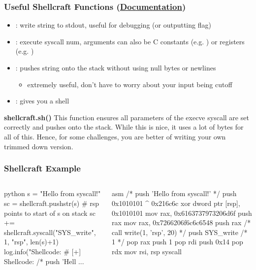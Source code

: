 \documentclass[aspectratio=169]{beamer}
\newcommand{\docl}[1]{(\textbf{\href{#1}{Documentation}})}
\begin{document}
{\begin{frame}[fragile]
    \frametitle{Useful Shellcraft Functions \docl{http://docs.pwntools.com/en/stable/shellcraft/amd64.html}}
    \begin{itemize}
        \item {}: write string to stdout, useful for debugging (or outputting flag)
        \item {}: execute syscall num, arguments can also be C constants (e.g. ) or registers (e.g. )
        \item {}: pushes string onto the stack without using null bytes or newlines
        \begin{itemize}
            \item extremely useful, don't have to worry about your input being cutoff
        \end{itemize}
        \item {}: gives you a shell
    \end{itemize}
    \begin{alertblock}{\textbf{shellcraft.sh()}}
        This function ensures all parameters of the execve syscall are set correctly and pushes  onto the stack.
        While this is nice, it uses a lot of bytes for all of this.
        Hence, for some challenges, you are better of writing your own trimmed down version.
    \end{alertblock}

\end{frame}

\begin{frame}[fragile]
    \frametitle{Shellcraft Example}
    \begin{columns}
        \begin{column}{0.5\textwidth}
            \begin{codebox}{python}
s = "Hello from syscall!"
sc = shellcraft.pushstr(s)
# rsp points to start of s on stack
sc += shellcraft.syscall("SYS_write",
    1, "rsp", len(s)+1)
log.info("Shellcode: %
# [+] Shellcode: /* push 'Hell ... \end{codebox}
        \end{column}
        \begin{column}{0.5\textwidth}
            \begin{codebox}{asm}
/* push 'Hello from syscall!' */
push 0x1010101 ^ 0x216c6c
xor dword ptr [rsp], 0x1010101
mov rax, 0x6163737973206d6f
push rax
mov rax, 0x7266206f6c6c6548
push rax
/* call write(1, 'rsp', 20) */
push SYS_write /* 1 */
pop rax
push 1
pop rdi
push 0x14
pop rdx
mov rsi, rsp
syscall\end{codebox}
        \end{column}
        \end{columns}
\end{frame}

}
\end{document}
